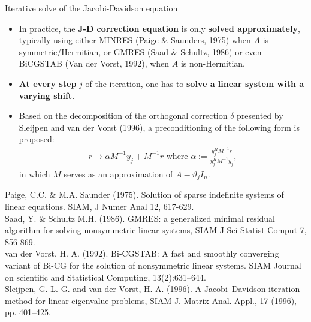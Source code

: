 \documentclass[t,usepdftitle=false]{beamer}
\begin{document}
\begin{frame}{Iterative solve of the Jacobi-Davidson equation}
\begin{itemize}
\item In practice, the \textbf{J-D correction equation} is only \textbf{solved approximately}, typically using either MINRES (Paige \& Saunders, 1975) when $A$ is symmetric/Hermitian, or GMRES (Saad \& Schultz, 1986) or even BiCGSTAB (Van der Vorst, 1992), when $A$ is non-Hermitian.
\item \textbf{At every step} $j$ of the iteration, one has to \textbf{solve a linear system with a varying shift}.
\item Based on the decomposition of the orthogonal correction $\delta$ presented by Sleijpen and van der Vorst (1996), a preconditioning of the following form is proposed:
\begin{align*}
r\mapsto\alpha M^{-1}y_j+M^{-1}r
\text{ where }
\alpha:=\frac{y_j^HM^{-1}r}{y_j^HM^{-1}y_j},
\end{align*}
in which $M$ serves as an approximation of $A-\vartheta_j I_n$.
\end{itemize}\smallskip
\tiny{Paige, C.C. \& M.A. Saunder (1975). Solution of sparse indefinite systems of linear equations. SIAM, J Numer Anal 12, 617-629.}\tiny\\
\tiny{Saad, Y. \& Schultz M.H. (1986). GMRES: a generalized minimal residual algorithm for solving nonsymmetric linear systems, SIAM J Sci Statist Comput 7, 856-869.}\tiny\\
\tiny{van der Vorst, H. A. (1992). Bi-CGSTAB: A fast and smoothly converging variant of Bi-CG
for the solution of nonsymmetric linear systems. SIAM Journal on scientific and Statistical Computing, 13(2):631–644.}\tiny\\
\tiny{Sleijpen, G. L. G. and van der Vorst, H. A. (1996). A Jacobi–Davidson iteration method
for linear eigenvalue problems, SIAM J. Matrix Anal. Appl., 17 (1996), pp. 401–425.}
\end{frame}
\end{document}
